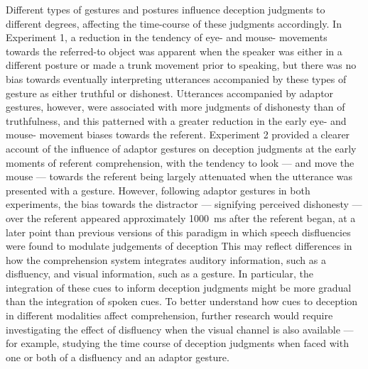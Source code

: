 \documentclass[a4paper,man,natbib]{apa6}
\begin{document}
Different types of gestures and postures influence deception judgments to different degrees, affecting the time-course of these judgments accordingly. 
In Experiment 1, a reduction in the tendency of eye- and mouse- movements towards the referred-to object was apparent when the speaker was either in a different posture or made a trunk movement prior to speaking, but there was no bias towards eventually interpreting utterances accompanied by these types of gesture as either truthful or dishonest.
Utterances accompanied by adaptor gestures, however, were associated with more judgments of dishonesty than of truthfulness, and this patterned with a greater reduction in the early eye- and mouse- movement biases towards the referent. 
Experiment 2 provided a clearer account of the influence of adaptor gestures on deception judgments at the early moments of referent comprehension, with the tendency to look --- and move the mouse --- towards the referent being largely attenuated when the utterance was presented with a gesture. 
However, following adaptor gestures in both experiments, the bias towards the distractor --- signifying perceived dishonesty --- over the referent appeared approximately 1000~ms after the referent began, at a later point than previous versions of this paradigm in which speech disfluencies were found to modulate judgements of deception 
This may reflect differences in how the comprehension system integrates auditory information, such as a disfluency, and visual information, such as a gesture.
In particular, the integration of these cues to inform deception judgments might be more gradual than the integration of spoken cues.
To better understand how cues to deception in different modalities affect comprehension, further research would require investigating the effect of disfluency when the visual channel is also available --- for example, studying the time course of deception judgments when faced with one or both of a disfluency and an adaptor gesture. %



\end{document}
